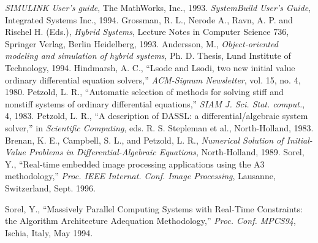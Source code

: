 \documentclass{book}
\begin{document}
\begin{thebibliography}{99}
 {\em SIMULINK User's guide}, The MathWorks, Inc., 1993.
 {\em SystemBuild User's Guide}, Integrated Systems
Inc., 1994.
 Grossman, R. L., Nerode A., Ravn, A. P. and Rischel H. (Eds.),
{\em Hybrid Systems}, Lecture Notes in Computer Science 736, Springer
Verlag, Berlin Heidelberg, 1993.
 Andersson, M., {\em Object-oriented modeling and
simulation of hybrid systems}, Ph. D. Thesis, Lund Institute of
Technology, 1994.
 Hindmarsh, A. C.,  ``Lsode and Lsodi, two new initial value
ordinary differential equation solvers,'' {\em
ACM-Signum Newsletter}, vol. 15, no. 4, 1980.
 Petzold, L. R., ``Automatic selection of methods for solving
stiff and nonstiff systems of ordinary differential equations,''
{\em SIAM J. Sci. Stat. comput.}, 4, 1983.
 Petzold, L. R., ``A description of DASSL: a
differential/algebraic system solver,'' in {\em Scientific Computing},
eds. R. S. Stepleman et al., North-Holland, 1983.
 Brenan, K. E., Campbell, S. L., and Petzold, L. R.,
{\em Numerical Solution of Initial-Value Problems in
Differential-Algebraic Equations}, North-Holland, 1989.
Sorel, Y., ``Real-time embedded image processing applications using
the A3 methodology,'' 
{\em Proc. IEEE Internat. Conf. Image Processing}, Lausanne, Switzerland, Sept. 1996.

Sorel, Y., ``Massively Parallel Computing Systems with Real-Time
Constraints: 
the Algorithm Architecture Adequation Methodology,''
{\em Proc. Conf. MPCS94}, Ischia, Italy, May 1994.

\end{thebibliography}
\end{document}

